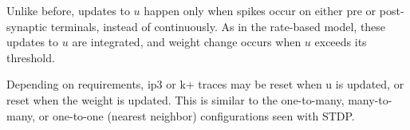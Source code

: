     Unlike before, updates to $u$ happen only when spikes occur on either pre or
    post-synaptic terminals, instead of continuously. As in the rate-based
    model, these updates to $u$ are integrated, and weight change occurs when
    $u$ exceeds its threshold.

    Depending on requirements, ip3 or k+ traces may be reset when u is updated,
    or reset when the weight is updated. This is similar to the one-to-many,
    many-to-many, or one-to-one (nearest neighbor) configurations seen with
    STDP.

    


    
    
    

